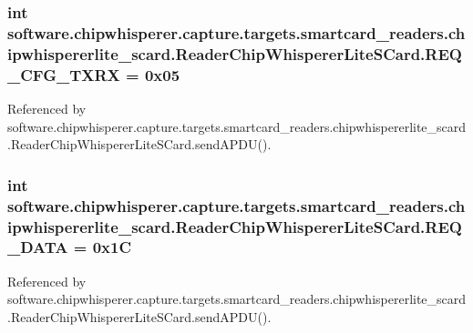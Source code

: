 \subsubsection[{R\+E\+Q\+\_\+\+C\+F\+G\+\_\+\+T\+X\+R\+X}]{\setlength{\rightskip}{0pt plus 5cm}int software.\+chipwhisperer.\+capture.\+targets.\+smartcard\+\_\+readers.\+chipwhispererlite\+\_\+scard.\+Reader\+Chip\+Whisperer\+Lite\+S\+Card.\+R\+E\+Q\+\_\+\+C\+F\+G\+\_\+\+T\+X\+R\+X = 0x05\hspace{0.3cm}{\ttfamily [static]}}\label{classsoftware_1_1chipwhisperer_1_1capture_1_1targets_1_1smartcard__readers_1_1chipwhispererlite_fcbff8031d4c94f40f5e5a51a3e4a7d0_a8d779e7fe760aff98f0d5da86cbfb8f7}


Referenced by software.\+chipwhisperer.\+capture.\+targets.\+smartcard\+\_\+readers.\+chipwhispererlite\+\_\+scard.\+Reader\+Chip\+Whisperer\+Lite\+S\+Card.\+send\+A\+P\+D\+U().

\hypertarget{classsoftware_1_1chipwhisperer_1_1capture_1_1targets_1_1smartcard__readers_1_1chipwhispererlite_fcbff8031d4c94f40f5e5a51a3e4a7d0_af8b2274ab57a82f66f16dd2d6dbbd12b}{}
\subsubsection[{R\+E\+Q\+\_\+\+D\+A\+T\+A}]{\setlength{\rightskip}{0pt plus 5cm}int software.\+chipwhisperer.\+capture.\+targets.\+smartcard\+\_\+readers.\+chipwhispererlite\+\_\+scard.\+Reader\+Chip\+Whisperer\+Lite\+S\+Card.\+R\+E\+Q\+\_\+\+D\+A\+T\+A = 0x1\+C\hspace{0.3cm}{\ttfamily [static]}}\label{classsoftware_1_1chipwhisperer_1_1capture_1_1targets_1_1smartcard__readers_1_1chipwhispererlite_fcbff8031d4c94f40f5e5a51a3e4a7d0_af8b2274ab57a82f66f16dd2d6dbbd12b}


Referenced by software.\+chipwhisperer.\+capture.\+targets.\+smartcard\+\_\+readers.\+chipwhispererlite\+\_\+scard.\+Reader\+Chip\+Whisperer\+Lite\+S\+Card.\+send\+A\+P\+D\+U().

